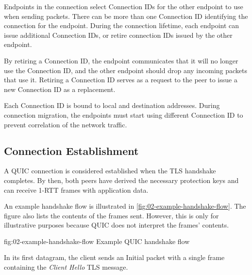 Endpoints in the connection select Connection IDs for the other endpoint to use when sending
packets. There can be more than one Connection ID identifying the connection for the endpoint.
During the connection lifetime, each endpoint can issue additional Connection IDs, or retire
connection IDs issued by the other endpoint.

By retiring a Connection ID, the endpoint communicates that it will no longer use the Connection ID,
and the other endpoint should drop any incoming packets that use it. Retiring a Connection ID serves
as a request to the peer to issue a new Connection ID as a replacement.

Each Connection ID is bound to local and destination addresses. During connection migration, the
endpoints must start using different Connection ID to prevent correlation of the network traffic.

\subsection{Connection Establishment}

A QUIC connection is considered established when the TLS handshake completes. By then, both peers
have derived the necessary protection keys and can receive 1-RTT frames with application data.

An example handshake flow is illustrated in \autoref{fig:02-example-handshake-flow}. The figure also
lists the contents of the \CRYPTO{} frames sent. However, this is only for illustrative purposes
because QUIC does not interpret the \CRYPTO{} frames' contents.


\begin{myFigure} {fig:02-example-handshake-flow} {Example QUIC handshake flow}

  \resizebox{\linewidth}{!}{}



\end{myFigure}

In its first datagram, the client sends an Initial packet with a single \CRYPTO{} frame containing the
\textit{Client Hello} TLS message.

